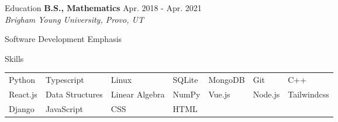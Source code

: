 \documentclass{resume} %
\begin{document}
\begin{rSection}{Education}
{\bf B.S., Mathematics }\hfill {Apr. 2018 - Apr. 2021} \\
\textit{Brigham Young University, Provo, UT}
    \begin{compactitem}
        \item Software Development Emphasis
    \end{compactitem}
\end{rSection}

\begin{rSection}{Skills}
        \begin{tabular}{ l l l l l l l }
            Python & Typescript & Linux & SQLite & MongoDB & Git & C++\\  
            React.js & Data Structures & Linear Algebra & NumPy & Vue.js & Node.js & Tailwindcss \\
            Django & JavaScript & CSS & HTML
        \end{tabular}
\end{rSection}
\end{document}
